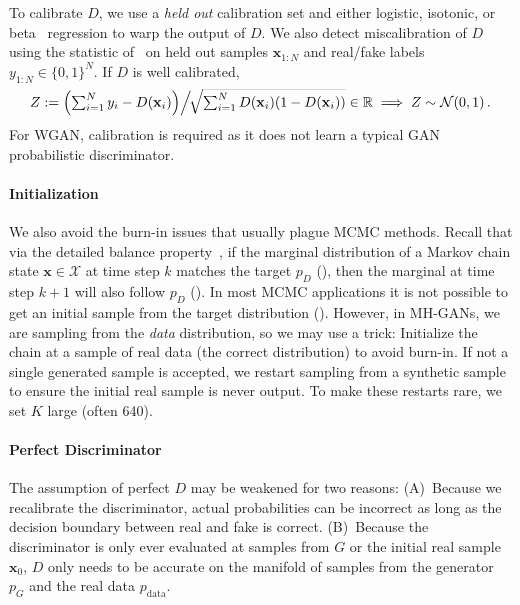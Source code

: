 \documentclass{article}
\renewcommand{\vec}[1]{{\boldsymbol{\mathbf{#1}}}} %
\newcommand{\R}{\mathbb{R}}
\newcommand{\set}[1]{\mathcal{#1}}
\newcommand{\sample}{\sim}
\newcommand{\norm}{\mathcal{N}}
\newcommand{\bern}{\textrm{Bern}}
\newcommand{\PG}{{p_G}}
\newcommand{\PD}{{p_D}}
\newcommand{\PR}{{p_{\textrm{data}}}}
\newcommand{\setx}{\set{X}}
\begin{document}
To calibrate $D$, we use a \emph{held out} calibration set and either logistic, isotonic, or beta~\citep{Kull2017} regression to warp the output of $D$.
We also detect miscalibration of $D$ using the statistic of~\citet{Dawid1997} on held out samples $\vec x_{1:N}$ and real/fake labels $y_{1:N} \in \{0,1\}^N$.
If $D$ is well calibrated, %
\begin{align}
  {\textstyle
  Z := \left(\sum_{i=1}^N y_i - D(\vec x_i)\middle) \right/ \!\!\smash{\sqrt{\sum_{i=1}^N D(\vec x_i) (1 - D(\vec x_i))}} \in \R \implies Z \sample \norm(0,1)\,.}
  \label{eq:calib score}
\end{align}
For WGAN, calibration is required as it does not learn a typical GAN probabilistic discriminator.

\paragraph{Initialization}
We also avoid the burn-in issues that usually plague MCMC methods.
Recall that via the detailed balance property~\citep[Ch.~1]{Gilks1996}, if the marginal distribution of a Markov chain state $\vec x \in \setx$ at time step $k$ matches the target $\PD$ (\smash{$\vec x_k \sample \PD$}), then the marginal at time step $k+1$ will also follow $\PD$ (\smash{$\vec x_{k+1} \sample \PD$})\@.
In most MCMC applications it is not possible to get an initial sample from the target distribution (\smash{$\vec x_0 \sample \PD$})\@.
However, in MH-GANs, we are sampling from the \emph{data} distribution, so we may use a trick:
Initialize the chain at a sample of real data (the correct distribution) to avoid burn-in.
If not a single generated sample is accepted, we restart sampling from a synthetic sample to ensure the initial real sample is never output.
To make these restarts rare, we set $K$ large (often 640)\@.

\paragraph{Perfect Discriminator}
The assumption of perfect $D$ may be weakened for two reasons:
(A)~Because we recalibrate the discriminator, actual probabilities can be incorrect as long as the decision boundary between real and fake is correct.
(B)~Because the discriminator is only ever evaluated at samples from $G$ or the initial real sample $\vec x_0$, $D$ only needs to be accurate on the manifold of samples from the generator $\PG$ and the real data $\PR$.
\end{document}
